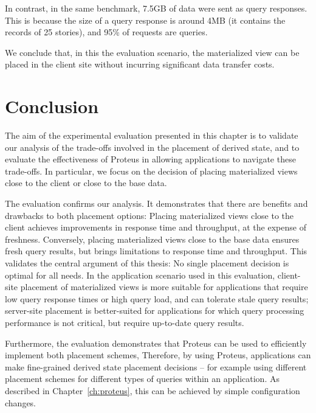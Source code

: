 In contrast, in the same benchmark, 7.5GB of data were sent as query responses.
This is because the size of a query response is around 4MB
(it contains the records of 25 stories), and 95\% of requests are queries.

We conclude that, in this the evaluation scenario, the materialized view can be placed in the client site without incurring
significant data transfer costs.

\section{Conclusion}

The aim of the experimental evaluation presented in this chapter is to validate our analysis of the trade-offs
involved in the placement of derived state,
and to evaluate the effectiveness of Proteus in allowing applications to navigate these trade-offs.
In particular, we focus on the decision of placing materialized views close to the client or close to the base data.

The evaluation confirms our analysis.
It demonstrates that there are benefits and drawbacks to both placement options:
Placing materialized views close to the client achieves improvements in response time and throughput,
at the expense of freshness.
Conversely, placing materialized views close to the base data ensures fresh query results,
but brings limitations to response time and throughput.
This validates the central argument of this thesis:
No single placement decision is optimal for all needs.
In the application scenario used in this evaluation,
client-site placement of materialized views is more suitable for applications that require low query response times or high
query load, and can tolerate stale query results;
server-site placement is better-suited for applications for which query processing performance is not critical,
but require up-to-date query results.

Furthermore, the evaluation demonstrates that Proteus can be used to efficiently implement both placement schemes,
Therefore, by using Proteus, applications can make fine-grained derived state placement decisions
-- for example using different placement schemes for different types of queries within an application.
As described in Chapter~\ref{ch:proteus}, this can be achieved by simple configuration changes.


